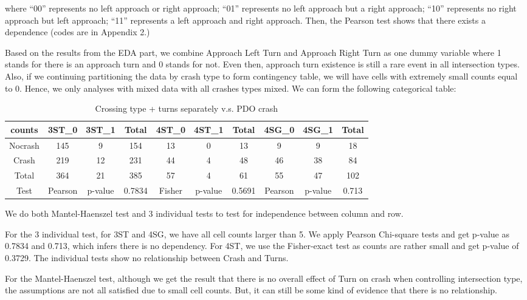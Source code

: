 \documentclass[11pt]{scrartcl} %
\begin{document}
where ``00'' represents no left approach or right approach; ``01'' represents no left approach but a right approach; ``10'' represents no right approach but left approach; ``11'' represents a left approach and right approach. Then, the Pearson test shows that there exists a dependence (codes are in Appendix 2.)

Based on the results from the EDA part, we combine Approach Left Turn and Approach Right Turn as one dummy variable where 1 stands for there is an approach turn and 0 stands for not. Even then, approach turn existence is still a rare event in all intersection types. Also, if we continuing partitioning the data by crash type to form contingency table, we will have cells with extremely small counts equal to 0. Hence, we only analyses with mixed data with all crashes types mixed. We can form the following categorical table:

\begin{table}[H]
\caption{Crossing type + turns separately v.s. PDO crash}
\centering
\tiny
\begin{tabular}{|c|c|c|c|c|c|c|c|c|c|}
\hline
counts  & 3ST\_0 & 3ST\_1 & Total & 4ST\_0 & 4ST\_1 & Total & 4SG\_0 & 4SG\_1 & Total \\
\hline
Nocrash & 145  & 9 & 154  & 13 & 0 & 13 & 9 & 9 & 18 \\
\hline
Crash   & 219  & 12 & 231 & 44 & 4 & 48 & 46 & 38 & 84 \\
\hline
Total   & 364  & 21 & 385 & 57 & 4 & 61 & 55 & 47 & 102 \\
\hline
Test    & Pearson & p-value & 0.7834 & Fisher & p-value & 0.5691 & Pearson & p-value & 0.713 \\
\hline
\end{tabular}
\end{table}

We do both Mantel-Haenszel test and 3 individual tests to test for independence between column and row.

For the 3 individual test, for 3ST and 4SG, we have all cell counts larger than 5. We apply Pearson Chi-square tests and get p-value as 0.7834 and 0.713, which infers there is no dependency. For 4ST, we use the Fisher-exact test as counts are rather small and get p-value of 0.3729. The individual tests show no relationship between Crash and Turns.

For the Mantel-Haenszel test, although we get the result that there is no overall effect of Turn on crash when controlling intersection type, the assumptions are not all satisfied due to small cell counts. But, it can still be some kind of evidence that there is no relationship.
\end{document}
